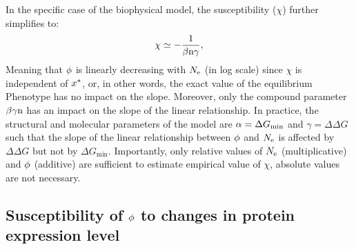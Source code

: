 In the specific case of the biophysical model, the susceptibility ($\chi$) further simplifies to:
\begin{gather}
    \chi \simeq -\dfrac{1}{\beta \Nsite \gamma}, \label{eq:chi_application}
\end{gather}
Meaning that $\phi$ is linearly decreasing with $N_{\mathrm{e}}$ (in log scale) since $\chi$ is independent of $x^{*}$, or, in other words, the exact value of the equilibrium \gls{Phenotype} has no impact on the slope.
Moreover, only the compound parameter $\beta \gamma \text{n}$ has an impact on the slope of the linear relationship.
In practice, the structural and molecular parameters of the model are $\alpha = \Delta G_{\text{min}}$ and $\gamma = \Delta \Delta G$ such that the slope of the linear relationship between $\phi$ and $N_{\mathrm{e}}$ is affected by $\Delta \Delta G$ but not by $\Delta G_{\text{min}}$.
Importantly, only relative values of $N_{\mathrm{e}}$ (multiplicative) and $\phi$ (additive) are sufficient to estimate empirical value of $\chi$, absolute values are not necessary.

\subsection{Susceptibility of \texorpdfstring{$\phi$}{φ} to changes in protein expression level}

\label{sec:expression}

